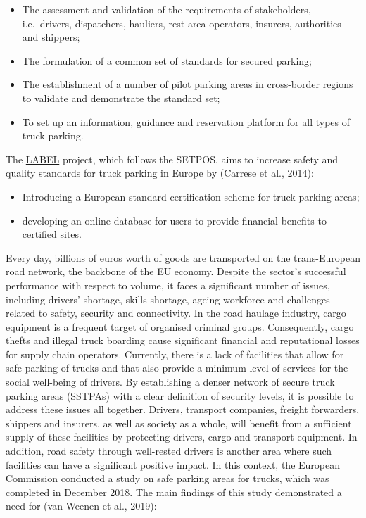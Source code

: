 \documentclass[
]{book}
\providecommand{\tightlist}{%
  \setlength{\itemsep}{0pt}\setlength{\parskip}{0pt}}
\begin{document}
\begin{itemize}
\tightlist
\item
  The assessment and validation of the requirements of stakeholders, i.e.~drivers, dispatchers, hauliers, rest area operators, insurers, authorities and shippers;
\item
  The formulation of a common set of standards for secured parking;
\item
  The establishment of a number of pilot parking areas in cross-border regions to validate and demonstrate the standard set;
\item
  To set up an information, guidance and reservation platform for all types of truck parking.
\end{itemize}

The \href{https://ec.europa.eu/transport/sites/transport/files/modes/road/parking/doc/handbook_for_labelling.pdf}{LABEL} project, which follows the SETPOS, aims to increase safety and quality standards for truck parking in Europe by (Carrese et al., 2014):

\begin{itemize}
\tightlist
\item
  Introducing a European standard certification scheme for truck parking areas;
\item
  developing an online database for users to provide financial benefits to certified sites.
\end{itemize}

Every day, billions of euros worth of goods are transported on the trans-European road network, the backbone of the EU economy. Despite the sector's successful performance with respect to volume, it faces a significant number of issues, including drivers' shortage, skills shortage, ageing workforce and challenges related to safety, security and connectivity. In the road haulage industry, cargo equipment is a frequent target of organised criminal groups. Consequently, cargo thefts and illegal truck boarding cause significant financial and reputational losses for supply chain operators.
Currently, there is a lack of facilities that allow for safe parking of trucks and that also provide a minimum level of services for the social well-being of drivers. By establishing a denser network of secure truck parking areas (SSTPAs) with a clear definition of security levels, it is possible to address these issues all together. Drivers, transport companies, freight forwarders, shippers and insurers, as well as society as a whole, will benefit from a sufficient supply of these facilities by protecting drivers, cargo and transport equipment. In addition, road safety through well-rested drivers is another area where such facilities can have a significant positive impact. In this context, the European Commission conducted a study on safe parking areas for trucks, which was completed in December 2018. The main findings of this study demonstrated a need for (van Weenen et al., 2019):
\end{document}
